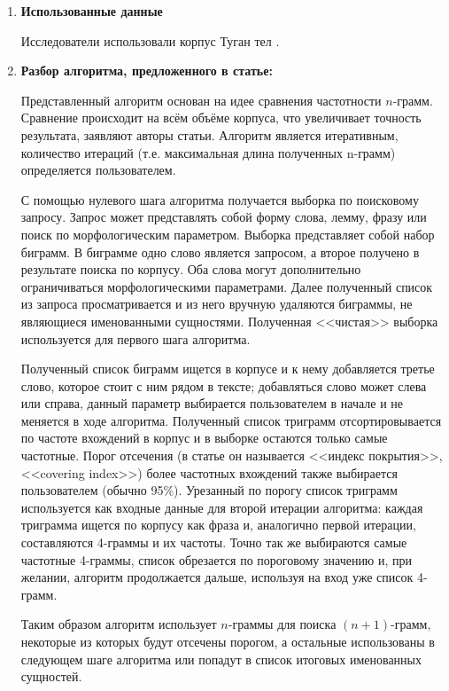 \begin{enumerate}

\item\textbf{Использованные данные}

Исследователи использовали корпус Туган тел \cite{tugan_tel}.

\item\textbf{Разбор алгоритма, предложенного в статье:}

Представленный алгоритм основан на идее сравнения частотности $n$-грамм. Сравнение происходит на всём 
объёме корпуса, что увеличивает точность результата, заявляют авторы статьи. Алгоритм является итеративным, количество итераций (т.е. максимальная длина полученных n-грамм) определяется пользователем.

С помощью нулевого шага алгоритма получается выборка по поисковому запросу. Запрос может 
представлять собой форму слова, лемму, фразу или поиск по морфологическим параметром. 
Выборка представляет собой набор биграмм. В биграмме одно 
слово является запросом, а второе получено в результате поиска по корпусу. Оба слова могут дополнительно ограничиваться морфологическими параметрами. Далее полученный список из запроса просматривается и из него вручную удаляются биграммы, не являющиеся именованными сущностями. Полученная <<чистая>> выборка используется для первого шага алгоритма.

Полученный список биграмм ищется в корпусе и к нему добавляется третье слово, которое стоит с ним рядом в тексте; добавляться слово может слева или справа, данный параметр выбирается пользователем в начале и не меняется в ходе алгоритма. Полученный список триграмм отсортировывается по частоте 
вхождений в корпус и в выборке остаются только самые частотные. Порог отсечения (в статье он называется <<индекс 
покрытия>>, <<covering index>>) более частотных вхождений также выбирается пользователем (обычно 95\%). 
Урезанный по порогу список триграмм используется как входные данные для второй итерации 
алгоритма: каждая триграмма ищется по корпусу как фраза и, аналогично первой итерации, 
составляются 4-граммы и их частоты. Точно так же выбираются самые частотные 4-граммы, список обрезается по пороговому значению и, при желании, алгоритм продолжается дальше, используя на вход уже список 4-грамм.

Таким образом алгоритм использует $n$-граммы для поиска $(n+1)$-грамм, некоторые из которых будут отсечены порогом, а остальные использованы в следующем шаге алгоритма или попадут в список итоговых именованных сущностей.


\end{enumerate}
